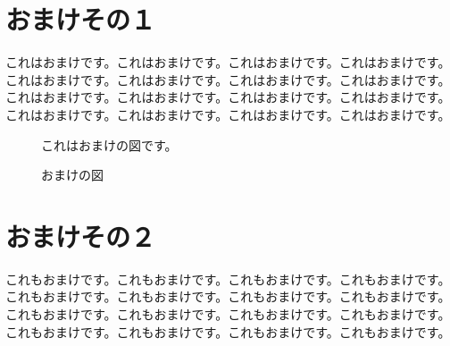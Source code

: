 \documentclass[12pt]{jarticle} %
\begin{document}
\section{おまけその１}
\label{omake1}

これはおまけです。これはおまけです。これはおまけです。これはおまけです。
これはおまけです。これはおまけです。これはおまけです。これはおまけです。
これはおまけです。これはおまけです。これはおまけです。これはおまけです。
これはおまけです。これはおまけです。これはおまけです。これはおまけです。

\begin{figure}
\centerline{これはおまけの図です。}
\caption{おまけの図}
\end{figure}


\section{おまけその２}

これもおまけです。これもおまけです。これもおまけです。これもおまけです。
これもおまけです。これもおまけです。これもおまけです。これもおまけです。
これもおまけです。これもおまけです。これもおまけです。これもおまけです。
これもおまけです。これもおまけです。これもおまけです。これもおまけです。
\end{document}

